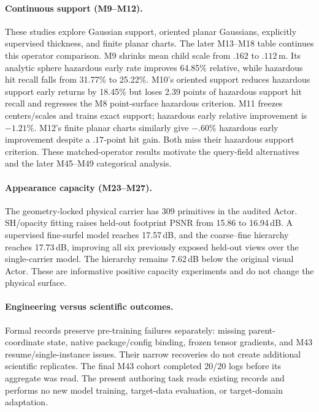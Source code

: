 \paragraph{Continuous support (M9--M12).}
These studies explore Gaussian support, oriented planar Gaussians, explicitly supervised thickness, and finite
planar charts. The later M13--M18 table continues this operator comparison.
M9 shrinks mean child scale from $.162$ to $.112$\,m. Its analytic sphere hazardous early rate improves
64.85\% relative, while hazardous hit recall falls from 31.77\% to 25.22\%.
M10's oriented support reduces hazardous support early returns by 18.45\% but loses 2.39 points of
hazardous support hit recall and regresses the M8 point-surface hazardous criterion.
M11 freezes centers/scales and trains exact support; hazardous early relative improvement is $-1.21\%$.
M12's finite planar charts similarly give $-.60\%$ hazardous early improvement despite a $.17$-point
hit gain. Both miss their hazardous support criterion. These matched-operator results motivate the
query-field alternatives and the later M45--M49 categorical analysis.

\paragraph{Appearance capacity (M23--M27).}
The geometry-locked physical carrier has 309 primitives in the audited Actor.
SH/opacity fitting raises held-out footprint PSNR from 15.86 to 16.94\,dB.
A supervised fine-surfel model reaches 17.57\,dB, and the coarse--fine hierarchy reaches 17.73\,dB,
improving all six previously exposed held-out views over the single-carrier model.
The hierarchy remains 7.62\,dB below the original visual Actor.
These are informative positive capacity experiments and do not change the physical surface.

\paragraph{Engineering versus scientific outcomes.}
Formal records preserve pre-training failures separately: missing parent-coordinate state, native package/config
binding, frozen tensor gradients, and M43 resume/single-instance issues.
Their narrow recoveries do not create additional scientific replicates.
The final M43 cohort completed 20/20 logs before its aggregate was read.
The present authoring task reads existing records and performs no new model training, target-data evaluation,
or target-domain adaptation.
